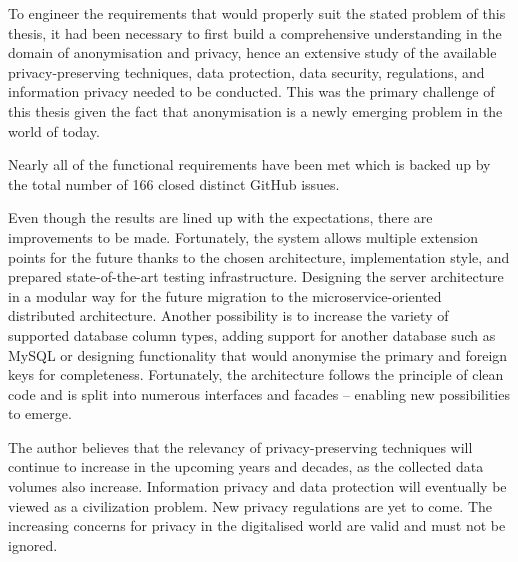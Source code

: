 \documentclass[a4paper,twoside,12pt]{book}
\newcounter{PagesWithoutNumbers}
\begin{document}
To engineer the requirements that would properly suit the stated problem of this thesis, it had been necessary to first build a comprehensive understanding in the domain of anonymisation and privacy, hence an extensive study of the available privacy-preserving techniques, data protection, data security, regulations, and information privacy needed to be conducted. This was the primary challenge of this thesis given the fact that anonymisation is a newly emerging problem in the world of today.

Nearly all of the functional requirements have been met which is backed up by the total number of 166 closed distinct GitHub issues.

Even though the results are lined up with the expectations, there are improvements to be made. Fortunately, the system allows multiple extension points for the future thanks to the chosen architecture, implementation style, and prepared state-of-the-art testing infrastructure. Designing the server architecture in a modular way for the future migration to the microservice-oriented distributed architecture. Another possibility is to increase the variety of supported database column types, adding support for another database such as MySQL or designing functionality that would anonymise the primary and foreign keys for completeness. Fortunately, the architecture follows the principle of clean code and is split into numerous interfaces and facades -- enabling new possibilities to emerge.

The author believes that the relevancy of privacy-preserving techniques will continue to increase in the upcoming years and decades, as the collected data volumes also increase. Information privacy and data protection will eventually be viewed as a civilization problem. New privacy regulations are yet to come. The increasing concerns for privacy in the digitalised world are valid and must not be ignored.


\backmatter
{}
\setcounter{page}{\value{PagesWithoutNumbers}}

\pagestyle{onlyPageNumbers}

\printbibliography           %

\end{document}
